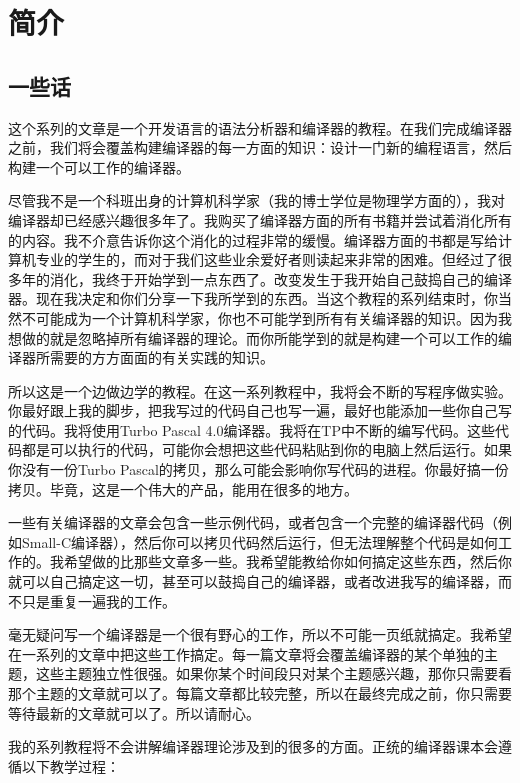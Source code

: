 \chapter{简介}

\section{一些话}

这个系列的文章是一个开发语言的语法分析器和编译器的教程。在我们完成编译器之前，我们将会覆盖构建编译器的每一方面的知识：设计一门新的编程语言，然后构建一个可以工作的编译器。

尽管我不是一个科班出身的计算机科学家（我的博士学位是物理学方面的），我对编译器却已经感兴趣很多年了。我购买了编译器方面的所有书籍并尝试着消化所有的内容。我不介意告诉你这个消化的过程非常的缓慢。编译器方面的书都是写给计算机专业的学生的，而对于我们这些业余爱好者则读起来非常的困难。但经过了很多年的消化，我终于开始学到一点东西了。改变发生于我开始自己鼓捣自己的编译器。现在我决定和你们分享一下我所学到的东西。当这个教程的系列结束时，你当然不可能成为一个计算机科学家，你也不可能学到所有有关编译器的知识。因为我想做的就是忽略掉所有编译器的理论。而你所能学到的就是构建一个可以工作的编译器所需要的方方面面的有关实践的知识。

所以这是一个边做边学的教程。在这一系列教程中，我将会不断的写程序做实验。你最好跟上我的脚步，把我写过的代码自己也写一遍，最好也能添加一些你自己写的代码。我将使用Turbo Pascal 4.0编译器。我将在TP中不断的编写代码。这些代码都是可以执行的代码，可能你会想把这些代码粘贴到你的电脑上然后运行。如果你没有一份Turbo Pascal的拷贝，那么可能会影响你写代码的进程。你最好搞一份拷贝。毕竟，这是一个伟大的产品，能用在很多的地方。

一些有关编译器的文章会包含一些示例代码，或者包含一个完整的编译器代码（例如Small-C编译器），然后你可以拷贝代码然后运行，但无法理解整个代码是如何工作的。我希望做的比那些文章多一些。我希望能教给你如何搞定这些东西，然后你就可以自己搞定这一切，甚至可以鼓捣自己的编译器，或者改进我写的编译器，而不只是重复一遍我的工作。

毫无疑问写一个编译器是一个很有野心的工作，所以不可能一页纸就搞定。我希望在一系列的文章中把这些工作搞定。每一篇文章将会覆盖编译器的某个单独的主题，这些主题独立性很强。如果你某个时间段只对某个主题感兴趣，那你只需要看那个主题的文章就可以了。每篇文章都比较完整，所以在最终完成之前，你只需要等待最新的文章就可以了。所以请耐心。

我的系列教程将不会讲解编译器理论涉及到的很多的方面。正统的编译器课本会遵循以下教学过程：

